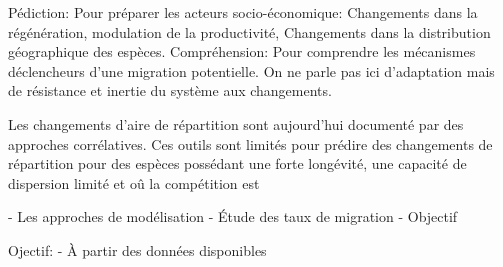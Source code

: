 Pédiction: Pour préparer les acteurs socio-économique: Changements dans la régénération, modulation de la productivité, Changements dans la distribution géographique des espèces.
Compréhension: Pour comprendre les mécanismes déclencheurs d'une migration potentielle. On ne parle pas ici d'adaptation mais de résistance et inertie du système aux changements.

Les changements d'aire de répartition sont aujourd'hui documenté par des approches corrélatives. Ces outils sont limités pour prédire des changements de répartition pour des espèces possédant une forte longévité, une capacité de dispersion limité et oû la compétition est

- Les approches de modélisation
- Étude des taux de migration
- Objectif 

Ojectif:
- À partir des données disponibles